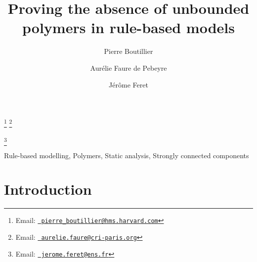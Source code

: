 \documentclass{entcs}
\begin{document}
\begin{frontmatter}
  \title{Proving the absence of unbounded polymers in rule-based models} \author{Pierre Boutillier}
  \address{Harvard Medical School, \\ Department of Systems Biology, Boston, MA 02115, USA}
  \author{Aur\'elie Faure de Pebeyre}
\address{Centre de recherche interdisciplinaire, 75004 Paris, France}
\address{INRIA, \\ Centre de recherche INRIA de Paris, 75 012 Paris, France}
\address{D\'{e}partement d'informatique de l'\'{E}cole normale sup\'{e}rieure,\\
\'Ecole normale sup\'erieure, CNRS, PSL Research University,
75 005 Paris, France}
  \author{J\'{e}r\^{o}me Feret}
  \address{INRIA, \\ Centre de recherche INRIA de Paris, 75 012 Paris, France}
  \address{D\'{e}partement d'informatique de l'\'{E}cole normale sup\'{e}rieure,\\
  \'Ecole normale sup\'erieure, CNRS, PSL Research University,
  75 005 Paris, France}
\thanks[pbemail]{Email:
    \href{mailto:pierre\_boutillier@hms.harvard.com} {\texttt{\normalshape
        pierre\_boutillier@hms.harvard.com}}}
\thanks[afemail]{Email:
            \href{mailto:aurelie.faure@cri-paris.org} {\texttt{\normalshape
        aurelie.faure@cri-paris.org}}}

\thanks[jfemail]{Email:
    \href{mailto:jerome.feret@ens.fr} {\texttt{\normalshape
        jerome.feret@ens.fr}}}
\begin{abstract}

\end{abstract}
\begin{keyword}
  Rule-based modelling,
Polymers,
Static analysis,
Strongly connected components
\end{keyword}
\end{frontmatter}



\section{Introduction}
\end{document}

